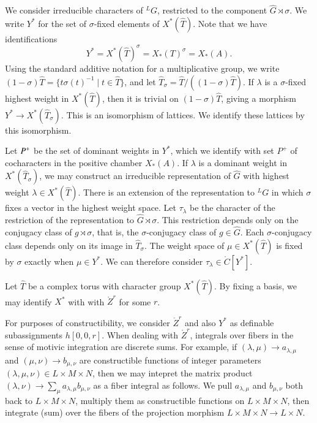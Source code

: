 We consider irreducible characters of ${}^LG$, restricted
to the component $\hat G \rtimes \sigma$.  We write $Y^*$ for the set of $\sigma$-fixed
elements of $X^*(\hat T)$.  Note that we have identifications
\[
Y^* = X^*(\hat T)^\sigma = X_*(T)^\sigma = X_*(A).
\]
Using the standard additive notation for a multiplicative group, 
we write $(1-\sigma)\hat T = \{ t\sigma(t)^{-1}\mid t\in\hat T\}$, and let $\hat T_\sigma = \hat T/((1-\sigma)\hat T)$.
If $\lambda$ is a $\sigma$-fixed highest weight in $X^*(\hat T)$, then it is trivial on $(1-\sigma)\hat T$,
giving a morphism $Y^*\to X^*(\hat T_\sigma)$.  This is an isomorphism of lattices.  We identify
these lattices by this isomorphism.

Let $P^+$ be the set of dominant weights in $Y^*$, which we identify with set $P^+$ of cocharacters in the positive chamber $X_*(A)$.
If $\lambda$ is a dominant weight in  $X^*(\hat T_\sigma)$, we may construct an irreducible representation
of $\hat G$ with highest weight $\lambda\in X^*(\hat T)$.  There is an extension of the representation to ${}^LG$ in
which $\sigma$ fixes a vector in the highest weight space.  Let $\tau_\lambda$ be the
character of the restriction of the representation to $\hat G\rtimes \sigma$.  This restriction depends only
on the conjugacy class of $g\rtimes\sigma$, that is, the $\sigma$-conjugacy class of $g\in \hat G$.
Each $\sigma$-conjugacy class depends only on its image in $\hat T_\sigma$.  The weight space of $\mu\in X^*(\hat T)$ is
fixed by $\sigma$ exactly when $\mu\in Y^*$. We can therefore
consider $\tau_\lambda\in \ring{C}[Y^*]$.

Let $\hat T$ be a complex torus with character group $X^*(\hat T)$.  
By fixing a basis, we may identify $X^*$ with
with $\ring{Z}^r$ for some $r$.  

\begin{remark}\label{rem:matrix}
For purposes of constructibility, we consider $\ring{Z}^r$ and also $Y^*$ as 
definable subassignments $h[0,0,r]$. When dealing with $\ring{Z}^r$, integrals over fibers
in the sense of motivic integration are discrete sums.  For example, if $(\lambda,\mu)\to a_{\lambda,\mu}$
and $(\mu,\nu)\to b_{\mu,\nu}$ are constructible functions of integer parameters $(\lambda,\mu,\nu)\in L\times M\times N$,
then we may intepret the matrix product $(\lambda,\nu)\to \sum_{\mu} a_{\lambda,\mu} b_{\mu,\nu}$ as a
fiber integral as follows.  We pull $a_{\lambda,\mu}$ and $b_{\mu,\nu}$ both back to $L\times M\times N$, multiply
them as constructible functions on $L\times M\times N$, then integrate (sum) over the fibers of the projection morphism
$L\times M\times N\to L\times N$.
\end{remark}

